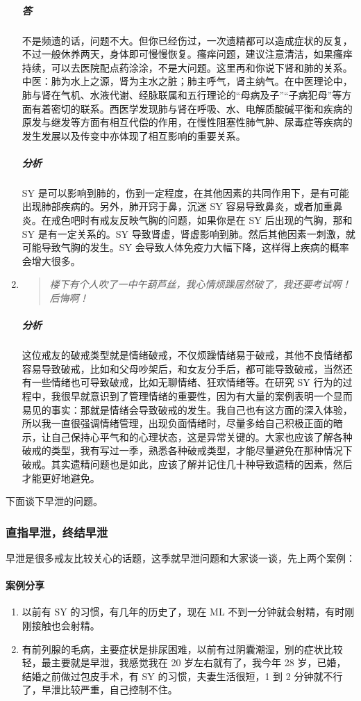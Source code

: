 \documentclass[fontset=founder]{ctexart}
\begin{document}
\begin{enumerate}
\begin{quote}
    \end{quote}
    \subparagraph{答} 不是频遗的话，问题不大。但你已经伤过，一次遗精都可以造成症状的反复，不过一般休养两天，身体即可慢慢恢复。瘙痒问题，建议注意清洁，如果瘙痒持续，可以去医院配点药涂涂，不是大问题。这里再和你说下肾和肺的关系。中医：肺为水上之源，肾为主水之脏；肺主呼气，肾主纳气。在中医理论中，肺与肾在气机、水液代谢、经脉联属和五行理论的“母病及子”“子病犯母”等方面有着密切的联系。西医学发现肺与肾在呼吸、水、电解质酸碱平衡和疾病的原发与继发等方面有相互代偿的作用，在慢性阻塞性肺气肿、尿毒症等疾病的发生发展以及传变中亦体现了相互影响的重要关系。
    \subparagraph{分析} SY 是可以影响到肺的，伤到一定程度，在其他因素的共同作用下，是有可能出现肺部疾病的。另外，肺开窍于鼻，沉迷 SY 容易导致鼻炎，或者加重鼻炎。在戒色吧时有戒友反映气胸的问题，如果你是在 SY 后出现的气胸，那和 SY 是有一定关系的。SY 导致肾虚，肾虚影响到肺。然后其他因素一刺激，就可能导致气胸的发生。SY 会导致人体免疫力大幅下降，这样得上疾病的概率会增大很多。
    \item \begin{quote}\it
        楼下有个人吹了一中午葫芦丝，我心情烦躁居然破了，我还要考试啊！后悔啊！
    \end{quote}
    \subparagraph{分析} 这位戒友的破戒类型就是情绪破戒，不仅烦躁情绪易于破戒，其他不良情绪都容易导致破戒，比如和父母吵架后，和女友分手后，都可能导致破戒，当然还有一些情绪也可导致破戒，比如无聊情绪、狂欢情绪等。在研究 SY 行为的过程中，我很早就意识到了管理情绪的重要性，因为有大量的案例表明一个显而易见的事实：那就是情绪会导致破戒的发生。我自己也有这方面的深入体验，所以我一直很强调情绪管理，出现负面情绪时，尽量多给自己积极正面的暗示，让自己保持心平气和的心理状态，这是异常关键的。大家也应该了解各种破戒的类型，我有写过一季，熟悉各种破戒类型，才能尽量避免在那种情况下破戒。其实遗精问题也是如此，应该了解并记住几十种导致遗精的因素，然后才能更好地避免。
\end{enumerate}

下面谈下早泄的问题。

\subsubsection{直指早泄，终结早泄}

早泄是很多戒友比较关心的话题，这季就早泄问题和大家谈一谈，先上两个案例：

\paragraph{案例分享}

\begin{enumerate}
    \item 以前有 SY 的习惯，有几年的历史了，现在 ML 不到一分钟就会射精，有时刚刚接触也会射精。
    \item 有前列腺的毛病，主要症状是排尿困难，以前有过阴囊潮湿，别的症状比较轻，最主要就是早泄，我感觉我在 20 岁左右就有了，我今年 28 岁，已婚，结婚之前做过包皮手术，有 SY 的习惯，夫妻生活很短，1 到 2 分钟就不行了，早泄比较严重，自己控制不住。
\end{enumerate}
\end{document}
